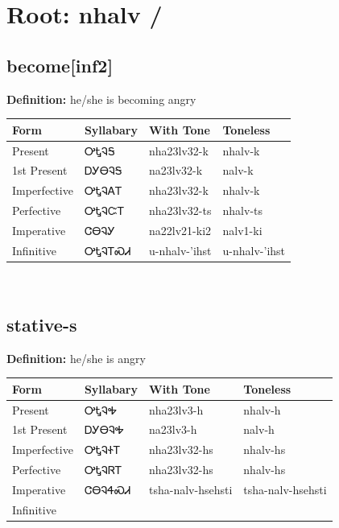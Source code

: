 \documentclass{article}%
\begin{document}
%
\normalsize%
\section*{Root: nhalv / }%
\subsection*{become[inf2]}%
\textbf{Definition: }%
he/she is becoming angry%
\\[0.5em]%
\begin{tabular}{|l|l|l|l|}%
\hline%
\textbf{Form}&\textbf{Syllabary}&\textbf{With Tone}&\textbf{Toneless}\\%
\hline%
Present&ᎤᎿᎸᎦ&nha23lv32{-}k&nhalv{-}k\\%
1st Present&ᎠᎩᎾᎸᎦ&na23lv32{-}k&nalv{-}k\\%
Imperfective&ᎤᎿᎸᎪᎢ&nha23lv32{-}k&nhalv{-}k\\%
Perfective&ᎤᎿᎸᏨᎢ&nha23lv32{-}ts&nhalv{-}ts\\%
Imperative&ᏣᎾᎸᎩ&na22lv21{-}ki2&nalv1{-}ki\\%
Infinitive&ᎤᎿᎸᎢᏍᏗ&u{-}nhalv{-}'ihst&u{-}nhalv{-}'ihst\\%
\hline%
\end{tabular}%
\\[1em]%
\subsection*{stative-s}%
\textbf{Definition: }%
he/she is angry%
\\[0.5em]%
\begin{tabular}{|l|l|l|l|}%
\hline%
\textbf{Form}&\textbf{Syllabary}&\textbf{With Tone}&\textbf{Toneless}\\%
\hline%
Present&ᎤᎿᎸᎭ&nha23lv3{-}h&nhalv{-}h\\%
1st Present&ᎠᎩᎾᎸᎭ&na23lv3{-}h&nalv{-}h\\%
Imperfective&ᎤᎿᎸᏐᎢ&nha23lv32{-}hs&nhalv{-}hs\\%
Perfective&ᎤᎿᎸᏒᎢ&nha23lv32{-}hs&nhalv{-}hs\\%
Imperative&ᏣᎾᎸᏎᏍᏗ&tsha{-}nalv{-}hsehsti&tsha{-}nalv{-}hsehsti\\%
Infinitive&&&\\%
\hline%
\end{tabular}%
\\[1em]%
\end{document}
